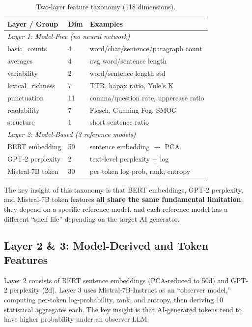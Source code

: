 \documentclass[sigconf,nonacm]{acmart}
\begin{document}
\begin{table}[t]
\caption{Two-layer feature taxonomy (118 dimensions).}
\label{tab:features}
\small
\begin{tabular}{llp{3.8cm}}
\toprule
\textbf{Layer / Group} & \textbf{Dim} & \textbf{Examples} \\
\midrule
\multicolumn{3}{l}{\textit{Layer 1: Model-Free (no neural network)}} \\
\quad basic\_counts    & 4  & word/char/sentence/paragraph count \\
\quad averages         & 4  & avg word/sentence length \\
\quad variability      & 2  & word/sentence length std \\
\quad lexical\_richness & 7  & TTR, hapax ratio, Yule's K \\
\quad punctuation      & 11 & comma/question rate, uppercase ratio \\
\quad readability      & 7  & Flesch, Gunning Fog, SMOG \\
\quad structure        & 1  & short sentence ratio \\
\midrule
\multicolumn{3}{l}{\textit{Layer 2: Model-Based (3 reference models)}} \\
\quad BERT embedding   & 50 & sentence embedding $\rightarrow$ PCA \\
\quad GPT-2 perplexity & 2  & text-level perplexity + log \\
\quad Mistral-7B token & 30 & per-token log-prob, rank, entropy \\
\bottomrule
\end{tabular}
\end{table}

The key insight of this taxonomy is that BERT embeddings, GPT-2 perplexity, and Mistral-7B token features \textbf{all share the same fundamental limitation}: they depend on a specific reference model, and each reference model has a different ``shelf life'' depending on the target AI generator.

\subsection{Layer 2 \& 3: Model-Derived and Token Features}

Layer 2 consists of BERT sentence embeddings (PCA-reduced to 50d) and GPT-2 perplexity (2d). Layer 3 uses Mistral-7B-Instruct as an ``observer model,'' computing per-token log-probability, rank, and entropy, then deriving 10 statistical aggregates each. The key insight is that AI-generated tokens tend to have higher probability under an observer LLM.
\end{document}
